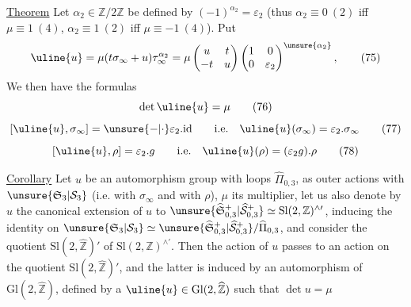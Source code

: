 \uline{Theorem} Let $\alpha_2\in\mathbb Z/2\mathbb Z$ be defined by
$(-1)^{\alpha_2}=\varepsilon_2$
(thus $\alpha_2\equiv0\ (2)$ iff $\mu\equiv1\ (4)$,
$\alpha_2\equiv1\ (2)$ iff
$\mu\equiv-1\ (4)$). Put
\[
\uline{u}=\mu(t\sigma_\infty+u)\tau_\infty^{\alpha_2}
=\mu\begin{pmatrix}u&t\\-t&u\end{pmatrix}
\begin{pmatrix}1&0\\0&\varepsilon_2\end{pmatrix}^{\unsure{\alpha_2}},
\tag{75}
\]
We then have the formulas
\[
\det\uline{u}=\mu
\tag{76}
\]
\[
[\uline{u},\sigma_\infty]=\unsure{-|\cdot}\varepsilon_2.\mathrm{id}
\qquad\text{i.e.}\quad\uline{u}(\sigma_\infty)=\varepsilon_2.\sigma_\infty
\tag{77}
\]
\[
[\uline{u},\rho]=\varepsilon_2.g
\qquad\text{i.e.}\quad\uline{u}(\rho)=(\varepsilon_2g).\rho
\tag{78}
\]

\uline{Corollary} Let $u$ be an automorphism  group
with loops $\widehat{\Pi}_{0,3}$,  as outer actions with
$\unsure{\mathfrak S_3|\mathcal S_3}$ (i.e. with $\sigma_\infty$ and with $\rho$), $\mu$
its multiplier, let us also denote by
$u$ the canonical extension of $u$ to
$\unsure{\widehat{\mathfrak S}_{0,3}^{+}|\widehat{\mathcal S}_{0,3}^{+}}
\simeq\mathrm{Sl}(2,\mathbb Z)^{\wedge\prime}$,
inducing the identity on
$\unsure{\mathfrak S_3|\mathcal S_3}
\simeq\unsure{\widehat{\mathfrak S}_{0,3}^{+}|\widehat{\mathcal S}_{0,3}^{+}}/
\widehat{\Pi}_{0,3}$,
and consider the quotient $\mathrm{Sl}(2,\widehat{\mathbb Z})'$ of
$\mathrm{Sl}(2,\mathbb Z)^{\wedge\prime}$. Then the action of $u$ passes
to an action on the quotient $\mathrm{Sl}(2,\widehat{\mathbb Z})'$,
and the latter is induced by an
automorphism of $\mathrm{Gl}(2,\widehat{\mathbb Z})$, defined by a
 $\uline{u}\in\mathrm{Gl}(2,\widehat{\mathbb Z})$
such that $\det u=\mu$

